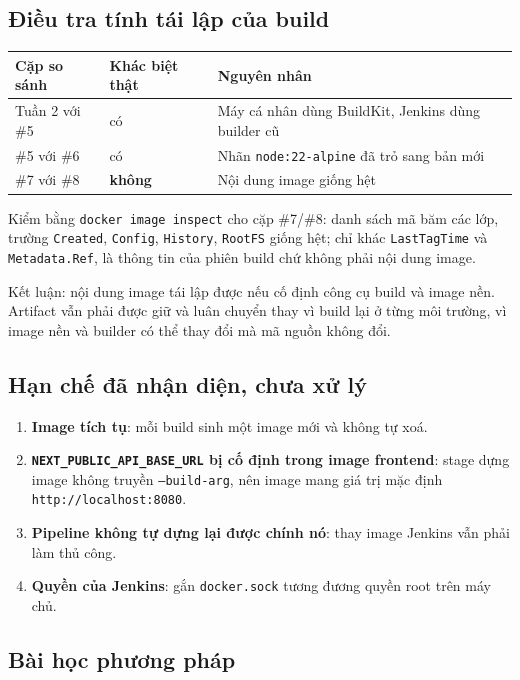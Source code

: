\documentclass[12pt,a4paper]{article}
\begin{document}
\subsection{Điều tra tính tái lập của build}

\begin{center}
\begin{tabularx}{\linewidth}{llX}
\toprule
Cặp so sánh & Khác biệt thật & Nguyên nhân \\
\midrule
Tuần 2 với \#5 & có & Máy cá nhân dùng BuildKit, Jenkins dùng builder cũ \\
\#5 với \#6 & có & Nhãn \texttt{node:22-alpine} đã trỏ sang bản mới \\
\#7 với \#8 & \textbf{không} & Nội dung image giống hệt \\
\bottomrule
\end{tabularx}
\end{center}

Kiểm bằng \texttt{docker image inspect} cho cặp \#7/\#8: danh sách mã băm các
lớp, trường \texttt{Created}, \texttt{Config}, \texttt{History}, \texttt{RootFS}
giống hệt; chỉ khác \texttt{LastTagTime} và \texttt{Metadata.Ref}, là thông tin
của phiên build chứ không phải nội dung image.

Kết luận: nội dung image tái lập được nếu cố định công cụ build và image nền.
Artifact vẫn phải được giữ và luân chuyển thay vì build lại ở từng môi trường,
vì image nền và builder có thể thay đổi mà mã nguồn không đổi.

\subsection{Hạn chế đã nhận diện, chưa xử lý}
\begin{enumerate}
  \item \textbf{Image tích tụ}: mỗi build sinh một image mới và không tự xoá.
  \item \textbf{\texttt{NEXT\_PUBLIC\_API\_BASE\_URL} bị cố định trong image frontend}:
        stage dựng image không truyền \texttt{--build-arg}, nên image mang giá
        trị mặc định \texttt{http://localhost:8080}.
  \item \textbf{Pipeline không tự dựng lại được chính nó}: thay image Jenkins
        vẫn phải làm thủ công.
  \item \textbf{Quyền của Jenkins}: gắn \texttt{docker.sock} tương đương quyền
        root trên máy chủ.
\end{enumerate}

\subsection{Bài học phương pháp}
\end{document}
